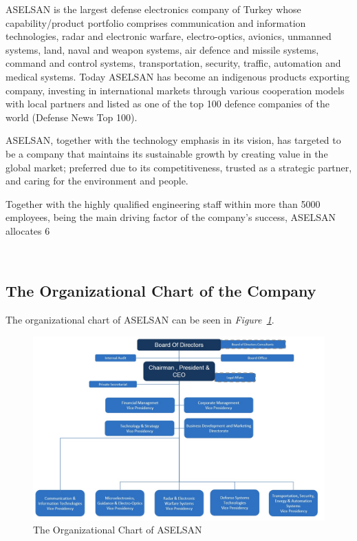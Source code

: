 	ASELSAN is the largest defense electronics company of Turkey whose capability/product portfolio comprises communication and information technologies, radar and electronic warfare, electro-optics, avionics, unmanned systems, land, naval and weapon systems, air defence and missile systems, command and control systems, transportation, security, traffic, automation and medical systems. Today ASELSAN has become an indigenous products exporting company, investing in international markets through various cooperation models with local partners and listed as one of the top 100 defence companies of the world (Defense News Top 100).

	ASELSAN, together with the technology emphasis in its vision, has targeted to be a company that maintains its sustainable growth by creating value in the global market; preferred due to its competitiveness, trusted as a strategic partner, and caring for the environment and people.

	Together with the highly qualified engineering staff within more than 5000 employees, being the main driving factor of the company's success, ASELSAN allocates 6%

​​
\subsection{The Organizational Chart of the Company}
\-
\indent
The organizational chart of ASELSAN can be seen in \textit{Figure~\ref{fig:orgc}}.

\begin{figure}[H]
\centering
\includegraphics[scale=0.37]{organizasyon}
\caption{\label{fig:orgc}The Organizational Chart of ASELSAN }
\end{figure}

